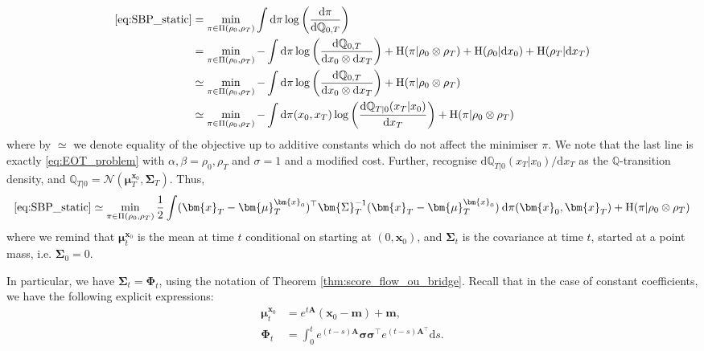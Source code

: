 \documentclass{article}
\newcommand{\Ent}{\operatorname{H}}
\newcommand{\diff}{\mathrm{d}}
\newcommand{\Nc}{\mathcal{N}}
\theoremstyle{newstyle}
\begin{document}
\begin{align}
  \eqref{eq:SBP_static} &= \min_{\pi \in \Pi(\rho_0, \rho_T)} \int \diff \pi \log \left( \frac{\diff \pi}{\diff \mathbb{Q}_{0, T}} \right) \\
                        &= \min_{\pi \in \Pi(\rho_0, \rho_T)} -\int \diff \pi \log \left( \frac{\diff \mathbb{Q}_{0, T}}{\diff x_0 \otimes \diff x_T} \right) + \Ent(\pi | \rho_0 \otimes \rho_T) + \Ent(\rho_0 | \diff x_0) + \Ent(\rho_T | \diff x_T) \\
                        &\simeq \min_{\pi \in \Pi(\rho_0, \rho_T)} -\int \diff \pi \log \left( \frac{\diff \mathbb{Q}_{0, T}}{\diff x_0 \otimes \diff x_T} \right) + \Ent(\pi | \rho_0 \otimes \rho_T) \\
                        &\simeq \min_{\pi \in \Pi(\rho_0, \rho_T)} -\int \diff \pi(x_0, x_T) \log \left( \frac{\diff \mathbb{Q}_{T|0}(x_T | x_0)}{\diff x_T} \right) + \Ent(\pi | \rho_0 \otimes \rho_T)
\end{align}
where by $\simeq$ we denote equality of the objective up to additive constants which do not affect the minimiser $\pi$. We note that the last line is exactly \eqref{eq:EOT_problem} with $\alpha, \beta = \rho_0, \rho_T$ and $\sigma = 1$ and a modified cost. 
Further, recognise $\diff \mathbb{Q}_{T|0}(x_T | x_0) / \diff x_T$ as the $\mathbb{Q}$-transition density, and $\mathbb{Q}_{T|0} = \Nc(\bm{\mu}_T^{\bm{x}_0}, \bm{\Sigma}_T)$. Thus, 
\begin{equation}
  \eqref{eq:SBP_static} \simeq \min_{\pi \in \Pi(\rho_0, \rho_T)} \frac{1}{2} \int (\bm{x}_T - \bm{\mu}_T^{\bm{x}_0})^\top \bm{\Sigma}_T^{-1} (\bm{x}_T - \bm{\mu}_T^{\bm{x}_0}) \: \diff \pi(\bm{x}_0, \bm{x}_T) + \Ent(\pi | \rho_0 \otimes \rho_T) \label{eq:static_mvOU_GSB_a}
\end{equation}
where we remind that $\bm{\mu}_t^{\bm{x}_0}$ is the mean at time $t$ conditional on starting at $(0, \bm{x}_0)$, and $\bm{\Sigma}_t$ is the covariance at time $t$, started at a point mass, i.e. $\bm{\Sigma}_0 = 0$.

In particular, we have $\bm{\Sigma}_t = \bm{\Phi}_t$, using the notation of Theorem \ref{thm:score_flow_ou_bridge}.
Recall that in the case of constant coefficients, we have the following explicit expressions:
\begin{align}
  \bm{\mu}_t^{\bm{x}_0} &= e^{t \bm{A}}(\bm{x}_0 - \bm{m}) + \bm{m}, \\
  \bm{\Phi}_t &= \int_0^t e^{(t-s)\bm{A}} \bm{\sigma}\bm{\sigma}^\top e^{(t-s)\bm{A}^\top} \diff s. 
\end{align}
\end{document}
